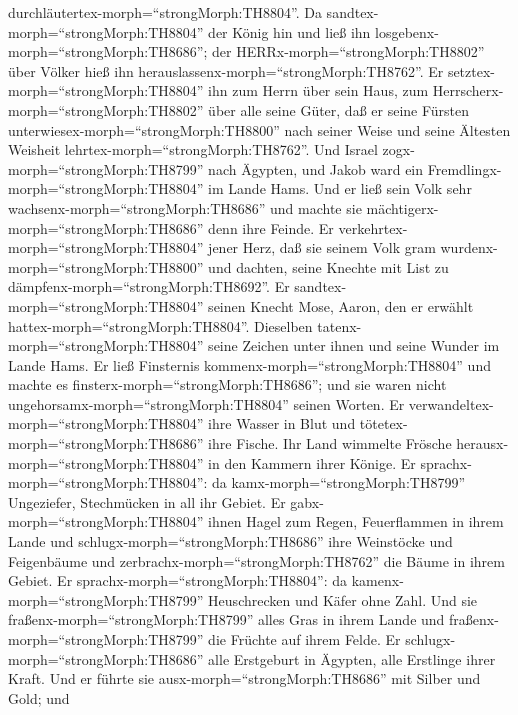 durchläutertex-morph=``strongMorph:TH8804''.  Da
sandtex-morph=``strongMorph:TH8804'' der König hin und ließ ihn
losgebenx-morph=``strongMorph:TH8686''; der
HERRx-morph=``strongMorph:TH8802'' über Völker hieß ihn
herauslassenx-morph=``strongMorph:TH8762''.  Er
setztex-morph=``strongMorph:TH8804'' ihn zum Herrn über sein Haus, zum
Herrscherx-morph=``strongMorph:TH8802'' über alle seine Güter,
 daß er seine Fürsten
unterwiesex-morph=``strongMorph:TH8800'' nach seiner Weise und seine
Ältesten Weisheit lehrtex-morph=``strongMorph:TH8762''. 
Und Israel zogx-morph=``strongMorph:TH8799'' nach Ägypten, und Jakob
ward ein Fremdlingx-morph=``strongMorph:TH8804'' im Lande Hams.
 Und er ließ sein Volk sehr
wachsenx-morph=``strongMorph:TH8686'' und machte sie
mächtigerx-morph=``strongMorph:TH8686'' denn ihre Feinde. 
Er verkehrtex-morph=``strongMorph:TH8804'' jener Herz, daß sie seinem
Volk gram wurdenx-morph=``strongMorph:TH8800'' und dachten, seine
Knechte mit List zu dämpfenx-morph=``strongMorph:TH8692''. 
Er sandtex-morph=``strongMorph:TH8804'' seinen Knecht Mose, Aaron, den
er erwählt hattex-morph=``strongMorph:TH8804''.  Dieselben
tatenx-morph=``strongMorph:TH8804'' seine Zeichen unter ihnen und seine
Wunder im Lande Hams.  Er ließ Finsternis
kommenx-morph=``strongMorph:TH8804'' und machte es
finsterx-morph=``strongMorph:TH8686''; und sie waren nicht
ungehorsamx-morph=``strongMorph:TH8804'' seinen Worten.  Er
verwandeltex-morph=``strongMorph:TH8804'' ihre Wasser in Blut und
tötetex-morph=``strongMorph:TH8686'' ihre Fische.  Ihr Land
wimmelte Frösche herausx-morph=``strongMorph:TH8804'' in den Kammern
ihrer Könige.  Er sprachx-morph=``strongMorph:TH8804'': da
kamx-morph=``strongMorph:TH8799'' Ungeziefer, Stechmücken in all ihr
Gebiet.  Er gabx-morph=``strongMorph:TH8804'' ihnen Hagel
zum Regen, Feuerflammen in ihrem Lande  und
schlugx-morph=``strongMorph:TH8686'' ihre Weinstöcke und Feigenbäume und
zerbrachx-morph=``strongMorph:TH8762'' die Bäume in ihrem Gebiet.
 Er sprachx-morph=``strongMorph:TH8804'': da
kamenx-morph=``strongMorph:TH8799'' Heuschrecken und Käfer ohne Zahl.
 Und sie fraßenx-morph=``strongMorph:TH8799'' alles Gras in
ihrem Lande und fraßenx-morph=``strongMorph:TH8799'' die Früchte auf
ihrem Felde.  Er schlugx-morph=``strongMorph:TH8686'' alle
Erstgeburt in Ägypten, alle Erstlinge ihrer Kraft.  Und er
führte sie ausx-morph=``strongMorph:TH8686'' mit Silber und Gold; und
